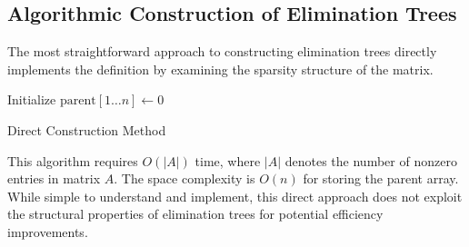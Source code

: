 \subsection{Algorithmic Construction of Elimination Trees}

The most straightforward approach to constructing elimination trees directly implements the definition by examining the sparsity structure of the matrix.

\begin{algorithm}
\BlankLine
Initialize $\text{parent}[1 \ldots n] \leftarrow 0$ 
\caption{Direct Construction Method}
\label{alg:direct_elimination_tree}
\end{algorithm}

This algorithm requires $O(|A|)$ time, where $|A|$ denotes the number of nonzero entries in matrix $A$. The space complexity is $O(n)$ for storing the parent array. While simple to understand and implement, this direct approach does not exploit the structural properties of elimination trees for potential efficiency improvements.

